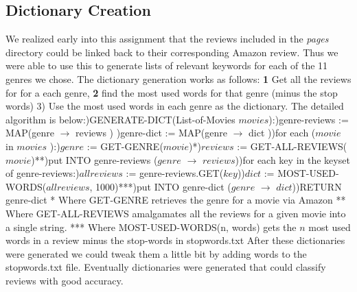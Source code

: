 \documentclass{article}
\newcommand\tab[1][1cm]{\hspace*{#1}}
\begin{document}
\subsection{Dictionary Creation}
We realized early into this assignment that the reviews included in the \textit{pages} directory could be linked back to their corresponding Amazon review. Thus we were able to use this to generate lists of relevant keywords for each of the 11 genres we chose. The dictionary generation works as follows: \textbf{1} Get all the reviews for for a each genre, \textbf{2} find the most used words for that genre (minus the stop words) 3) Use the most used words in each genre as the dictionary. The detailed algorithm is below:\newline\newline\newline\newline\newline\newline{})\tab  GENERATE-DICT(List-of-Movies $movies$):)\tab\tab genre-reviews := MAP(genre $\rightarrow$ reviews ) )\tab\tab genre-dict := MAP(genre $\rightarrow $ dict ))\tab\tab for each ($movie$ in $movies$ ):)\tab\tab\tab $genre$ := GET-GENRE($movie$)*)\tab\tab\tab $reviews$ := GET-ALL-REVIEWS($movie$)**)\tab\tab\tab put INTO genre-reviews ($genre$ $\rightarrow$ $reviews$))\tab\tab for each key in the keyset of genre-reviews:)\tab\tab\tab $allreviews$ := genre-reviews.GET($key$))\tab\tab\tab $dict$ := MOST-USED-WORDS($allreviews$, 1000)***)\tab\tab\tab put INTO genre-dict ($genre$ $\rightarrow$ $dict$))\tab RETURN genre-dict\newline\newline
* Where GET-GENRE retrieves the genre for a movie via Amazon\newline
** Where GET-ALL-REVIEWS amalgamates all the reviews for a given movie into a single string.\newline
*** Where MOST-USED-WORDS(n, words) gets the $n$ most used words in a review minus the stop-words in stopwords.txt\newline\newline
After these dictionaries were generated we could tweak them a little bit by adding words to the stopwords.txt file. Eventually dictionaries were generated that could classify reviews with good accuracy.
\end{document}
